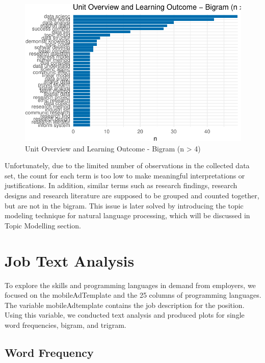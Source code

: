 \documentclass[
  letterpaper,
]{report}
\begin{document}
\begin{figure}

{\centering \includegraphics{./03_2-unitext_files/figure-pdf/fig-bigram-1.pdf}

}

\caption{\label{fig-bigram}Unit Overview and Learning Outcome - Bigram
(n \textgreater{} 4)}

\end{figure}

Unfortunately, due to the limited number of observations in the
collected data set, the count for each term is too low to make
meaningful interpretations or justifications. In addition, similar terms
such as research findings, research designs and research literature are
supposed to be grouped and counted together, but are not in the bigram.
This issue is later solved by introducing the topic modeling technique
for natural language processing, which will be discussed in Topic
Modelling section.

\hypertarget{sec-job-analysis}{%
\chapter{Job Text Analysis}\label{sec-job-analysis}}

To explore the skills and programming languages in demand from
employers, we focused on the mobileAdTemplate and the 25 columns of
programming languages. The variable mobileAdtemplate contains the job
description for the position. Using this variable, we conducted text
analysis and produced plots for single word frequencies, bigram, and
trigram.

\hypertarget{sec-word-frequency}{%
\section{Word Frequency}\label{sec-word-frequency}}
\end{document}
